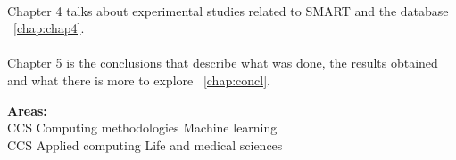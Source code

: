 \paragraph{} Chapter 4 talks about experimental studies related to SMART and the database  ~\ref{chap:chap4}.
\paragraph{} Chapter 5 is the conclusions that describe what was done, the results obtained and what there is more to explore ~\ref{chap:concl}.

\espaco \espaco \espaco 




\textbf{Areas: }\\ CCS \textrightarrow   Computing \hspace{0.1cm} methodologies \textrightarrow  Machine\hspace{0.1cm} learning \\ CCS \textrightarrow   Applied \hspace{0.1cm}computing \textrightarrow    Life\hspace{0.1cm} and \hspace{0.1cm}medical \hspace{0.1cm}sciences

 